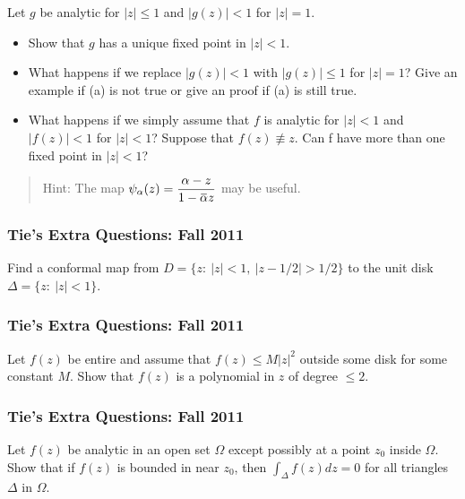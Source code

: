 Let \(g\) be analytic for \(|z|\leq 1\) and \(|g(z)| < 1\) for
\(|z| = 1\).

\begin{itemize}
\item
  Show that \(g\) has a unique fixed point in \(|z| < 1\).
\item
  What happens if we replace \(|g(z)| < 1\) with \(|g(z)|\leq 1\) for
  \(|z|=1\)? Give an example if (a) is not true or give an proof if (a)
  is still true.
\item
  What happens if we simply assume that \(f\) is analytic for
  \(|z| < 1\) and \(|f(z)| < 1\) for \(|z| < 1\)? Suppose that
  \(f(z) \not\equiv z\). Can f have more than one fixed point in
  \(|z| < 1\)?
\end{itemize}

\begin{quote}
Hint: The map
\(\displaystyle{\psi_{\alpha}(z)=\frac{\alpha-z}{1-\mkern 1.5mu\overline{\mkern-1.5mu\alpha\mkern-1.5mu}\mkern 1.5muz}}\)
may be useful.
\end{quote}

\hypertarget{ties-extra-questions-fall-2011-8}{%
\subsubsection{Tie's Extra Questions: Fall
2011}\label{ties-extra-questions-fall-2011-8}}

Find a conformal map from \(D = \{z :\  |z| < 1,\ |z - 1/2| > 1/2\}\) to
the unit disk \(\Delta=\{z: \ |z|<1\}\).

\hypertarget{ties-extra-questions-fall-2011-9}{%
\subsubsection{Tie's Extra Questions: Fall
2011}\label{ties-extra-questions-fall-2011-9}}

Let \(f(z)\) be entire and assume that \(f(z) \leq M |z|^2\) outside
some disk for some constant \(M\). Show that \(f(z)\) is a polynomial in
\(z\) of degree \(\leq 2\).

\hypertarget{ties-extra-questions-fall-2011-10}{%
\subsubsection{Tie's Extra Questions: Fall
2011}\label{ties-extra-questions-fall-2011-10}}

Let \(f(z)\) be analytic in an open set \(\Omega\) except possibly at a
point \(z_0\) inside \(\Omega\). Show that if \(f(z)\) is bounded in
near \(z_0\), then \(\displaystyle \int_\Delta f(z) dz = 0\) for all
triangles \(\Delta\) in \(\Omega\).

